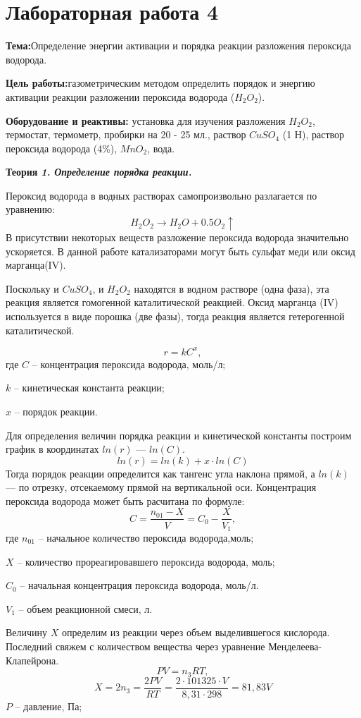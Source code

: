 \section{Лабораторная работа 4 }
\textbf{Тема:}Определение энергии активации и порядка реакции разложения пероксида водорода.

\textbf{Цель работы:}газометрическим методом определить порядок и энергию активации реакции разложении пероксида водорода ($H_{2}O_{2}$).

\textbf{Оборудование и реактивы:} установка для изучения разложения $H_{2}O_{2}$, термостат, термометр, пробирки на 20 - 25 мл., раствор $CuSO_{4}$ (1 Н), раствор пероксида водорода (4\%), $MnO_{2}$, вода.

\textbf{Теория}
\textit{\textbf{1. Определение порядка реакции.}}

Пероксид водорода в водных растворах самопроизвольно разлагается по уравнению:
$$H_{2}O_{2}\rightarrow H_{2}O+0.5O_{2}\uparrow$$
В присутствии некоторых веществ разложение пероксида водорода значительно ускоряется. В данной работе катализаторами могут быть сульфат меди или оксид марганца(IV).

Поскольку и $CuSO_{4}$, и $H_{2}O_{2}$ находятся в водном растворе (одна фаза), эта реакция является гомогенной каталитической реакцией. Оксид марганца (IV) используется в виде порошка (две фазы), тогда реакция является гетерогенной каталитической.

$$r=kC^{x},$$
где $C$ -- концентрация пероксида водорода, моль/л;

$k$ -- кинетическая константа реакции;

$x$ -- порядок реакции.

Для определения величин порядка реакции и кинетической константы построим график в координатах $ln(r)$ --- $ln(C)$. 
$$ln(r)=ln(k)+x\cdot ln(C)$$
Тогда порядок реакции определится как тангенс угла наклона прямой, а $ln(k)$ --- по отрезку, отсекаемому прямой на вертикальной оси.
Концентрация пероксида водорода может быть расчитана по формуле:
$$C=\frac{n_{01}-X}{V}=C_{0}-\frac{X}{V_{1}},$$
где $n_{01}$ -- начальное количество пероксида водорода,моль;

$X$ -- количество прореагировавшего пероксида водорода, моль;

$C_{0}$ -- начальная концентрация пероксида водорода, моль/л.

$V_{1}$ -- объем реакционной смеси, л.

Величину $X$ определим из реакции через объем выделившегося кислорода. Последний свяжем с количеством вещества через уравнение Менделеева-Клапейрона.
$$PV=n_{3}RT,$$
$$X=2n_{3}=\frac{2PV}{RT}=\frac{2\cdot 101325\cdot V}{8,31\cdot 298}=81,83V$$
$P$ -- давление, Па;

